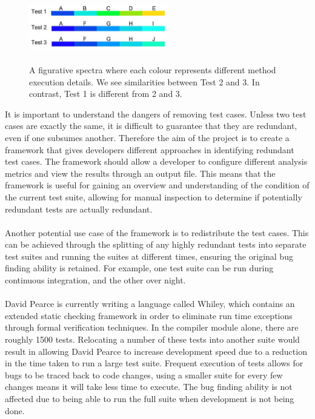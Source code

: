 \begin{figure}[h]
\centering
\includegraphics[width=6cm,height=3cm]{spectra.png}
\caption{A figurative spectra where each colour represents different method execution details. We see similarities between Test 2 and 3. In contrast, Test 1 is different from 2 and 3. }
\label{fig:spectra}
\end{figure}

It is important to understand the dangers of removing test cases. Unless two test cases are exactly the same, it is difficult to guarantee that they are redundant, even if one subsumes another. Therefore the aim of the project is to create a framework that gives developers different approaches in identifying redundant test cases. The framework should allow a developer to configure different analysis metrics and view the results through an output file. This means that the framework is useful for gaining an overview and understanding of the condition of the current test suite, allowing for manual inspection to determine if potentially redundant tests are actually redundant.
\paragraph{}
Another potential use case of the framework is to redistribute the test cases. This can be achieved through the splitting of any highly redundant tests into separate test suites and running the suites at different times, ensuring the original bug finding ability is retained. For example, one test suite can be run during continuous integration, and the other over night.
\paragraph{}
David Pearce is currently writing a language called Whiley, which contains an extended static checking framework in order to eliminate run time exceptions through formal verification techniques. In the compiler module alone, there are roughly 1500 tests. Relocating a number of these tests into another suite would result in allowing David Pearce to increase development speed due to a reduction in the time taken to run a large test suite. Frequent execution of tests allows for bugs to be traced back to code changes, using a smaller suite for every few changes means it will take less time to execute. The bug finding ability is not affected due to being able to run the full suite when development is not being done. 
